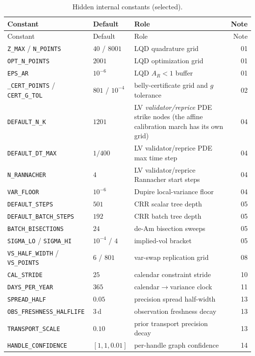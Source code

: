 \documentclass[11pt]{article}
\begin{document}
\begin{longtable}{p{}p{}p{}r}
\caption{Hidden internal constants (selected).}\label{tab:master_hidden}\\
\toprule
Constant & Default & Role & Note\\
\midrule
\endfirsthead
\toprule Constant & Default & Role & Note\\ \midrule
\endhead
\texttt{Z\_MAX} / \texttt{N\_POINTS} & $40$ / $8001$ & LQD quadrature grid & 01\\
\texttt{OPT\_N\_POINTS} & $2001$ & LQD optimization grid & 01\\
\texttt{EPS\_AR} & $10^{-6}$ & LQD $A_R<1$ buffer & 01\\
\texttt{\_CERT\_POINTS} / \texttt{CERT\_G\_TOL} & $801$ / $10^{-4}$ &
belly-certificate grid and $g$ tolerance & 02\\
\texttt{DEFAULT\_N\_K} & $1201$ & LV \emph{validator/reprice} PDE strike nodes
(the affine calibration march has its own grid) & 04\\
\texttt{DEFAULT\_DT\_MAX} & $1/400$ & LV validator/reprice PDE max time step & 04\\
\texttt{N\_RANNACHER} & $4$ & LV validator/reprice Rannacher start steps & 04\\
\texttt{VAR\_FLOOR} & $10^{-6}$ & Dupire local-variance floor & 04\\
\texttt{DEFAULT\_STEPS} & $501$ & CRR scalar tree depth & 05\\
\texttt{DEFAULT\_BATCH\_STEPS} & $192$ & CRR batch tree depth & 05\\
\texttt{BATCH\_BISECTIONS} & $24$ & de-Am bisection sweeps & 05\\
\texttt{SIGMA\_LO} / \texttt{SIGMA\_HI} & $10^{-4}$ / $4$ & implied-vol bracket & 05\\
\texttt{VS\_HALF\_WIDTH} / \texttt{VS\_POINTS} & $6$ / $801$ & var-swap replication grid & 08\\
\texttt{CAL\_STRIDE} & $25$ & calendar constraint stride & 10\\
\texttt{DAYS\_PER\_YEAR} & $365$ & calendar$\to$variance clock & 11\\
\texttt{SPREAD\_HALF} & $0.05$ & precision spread half-width & 13\\
\texttt{OBS\_FRESHNESS\_HALFLIFE} & $3$\,d & observation freshness decay & 13\\
\texttt{TRANSPORT\_SCALE} & $0.10$ & prior transport precision decay & 13\\
\texttt{HANDLE\_CONFIDENCE} & $[1,1,0.01]$ & per-handle graph confidence & 14\\

\end{longtable}
\end{document}
